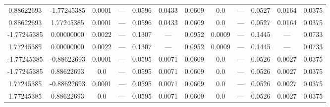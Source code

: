 \documentclass[a4paper,14pt]{extarticle}
\begin{document}
\begin{landscape}
\begin{table}[H]
\begin{tabular}{|c|c|*{5}{c}|*{5}{c}|}
 0.88622693        & -1.77245385        & 0.0001 & ---    & 0.0596 & 0.0433 & 0.0609 & 0.0    & ---    & 0.0527 & 0.0164 & 0.0375 \\ 
 0.88622693        &  1.77245385        & 0.0001 & ---    & 0.0596 & 0.0433 & 0.0609 & 0.0    & ---    & 0.0527 & 0.0164 & 0.0375 \\ 
-1.77245385        &  0.00000000        & 0.0022 & ---    & 0.1307 & ---    & 0.0952 & 0.0009 & ---    & 0.1445 & ---    & 0.0733 \\ 
 1.77245385        &  0.00000000        & 0.0022 & ---    & 0.1307 & ---    & 0.0952 & 0.0009 & ---    & 0.1445 & ---    & 0.0733 \\ 
-1.77245385        & -0.88622693        & 0.0001 & ---    & 0.0595 & 0.0071 & 0.0609 & 0.0    & ---    & 0.0526 & 0.0027 & 0.0375 \\ 
-1.77245385        &  0.88622693        & 0.0    & ---    & 0.0595 & 0.0071 & 0.0609 & 0.0    & ---    & 0.0526 & 0.0027 & 0.0375 \\ 
 1.77245385        & -0.88622693        & 0.0001 & ---    & 0.0595 & 0.0071 & 0.0609 & 0.0    & ---    & 0.0526 & 0.0027 & 0.0375 \\ 
 1.77245385        &  0.88622693        & 0.0    & ---    & 0.0595 & 0.0071 & 0.0609 & 0.0    & ---    & 0.0526 & 0.0027 & 0.0375 \\ 
\hline
\end{tabular}
\end{table} 


\end{landscape}
\end{document}
